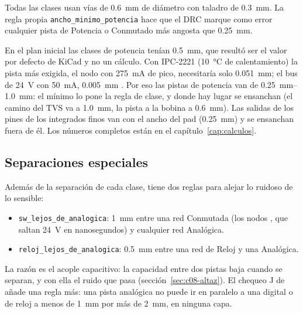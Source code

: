 Todas las clases usan vías de \SI{0.6}{\milli\meter} de diámetro con taladro de \SI{0.3}{\milli\meter}. La regla
propia \texttt{ancho\_minimo\_potencia} hace que el DRC marque como error cualquier pista de Potencia o Conmutado más
angosta que \SI{0.25}{\milli\meter}.

\begin{idea}
En el plan inicial las clases de potencia tenían \SI{0.5}{\milli\meter}, que resultó ser el valor por defecto de
KiCad y no un cálculo. Con IPC-2221 (\SI{10}{\celsius} de calentamiento) la pista más exigida, el nodo  con
\SI{275}{\milli\ampere} de pico, necesitaría solo \SI{0.051}{\milli\meter}; el bus de \SI{24}{\volt} con
\SI{50}{\milli\ampere}, \SI{0.005}{\milli\meter}  . Por eso las pistas de
potencia van de \SIrange{0.25}{1.0}{\milli\meter}: el mínimo lo pone la regla de clase, y donde hay lugar se
ensanchan (el camino del TVS va a \SI{1.0}{\milli\meter}, la pista  a la bobina a \SI{0.6}{\milli\meter}).
Las salidas de los pines de los integrados finos van con el ancho del pad (\SI{0.25}{\milli\meter}) y se ensanchan
fuera de él. Los números completos están en el capítulo~\ref{cap:calculos}.
\end{idea}

\subsection{Separaciones especiales}

Además de la separación de cada clase,  tiene dos reglas para alejar lo ruidoso de lo sensible:
\begin{itemize}
  \item \texttt{sw\_lejos\_de\_analogica}: \SI{1}{\milli\meter} entre una red Conmutada (los nodos , que saltan
  \SI{24}{\volt} en nanosegundos) y cualquier red Analógica.
  \item \texttt{reloj\_lejos\_de\_analogica}: \SI{0.5}{\milli\meter} entre una red de Reloj y una Analógica.
\end{itemize}
La razón es el acople capacitivo: la capacidad entre dos pistas baja cuando se separan, y con ella el ruido que pasa
(sección~\ref{sec:c08-altaz}). El chequeo J de  añade una regla más: una pista analógica no
puede ir en paralelo a una digital o de reloj a menos de \SI{1}{\milli\meter} por más de \SI{2}{\milli\meter}, en
ninguna capa.

